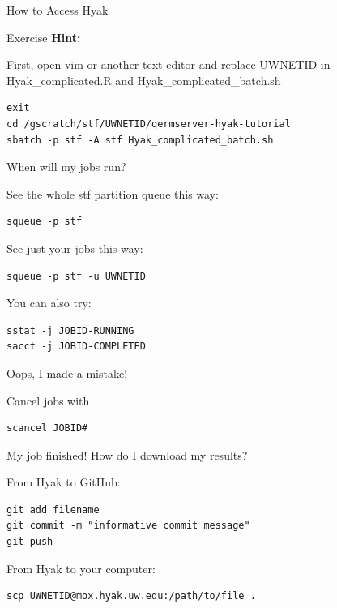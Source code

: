 \documentclass[ignorenonframetext,]{beamer}
\begin{document}
\begin{frame}[fragile]{How to Access Hyak}
\begin{block}{Exercise}
\textbf{Hint:}

First, open vim or another text editor and replace UWNETID in
Hyak\_complicated.R and Hyak\_complicated\_batch.sh

\begin{verbatim}
exit
cd /gscratch/stf/UWNETID/qermserver-hyak-tutorial
sbatch -p stf -A stf Hyak_complicated_batch.sh
\end{verbatim}

\end{block}

\begin{block}{When will my jobs run?}

See the whole stf partition queue this way:

\begin{verbatim}
squeue -p stf
\end{verbatim}

See just your jobs this way:

\begin{verbatim}
squeue -p stf -u UWNETID
\end{verbatim}

You can also try:

\begin{verbatim}
sstat -j JOBID-RUNNING
sacct -j JOBID-COMPLETED
\end{verbatim}

\end{block}

\begin{block}{Oops, I made a mistake!}

Cancel jobs with

\begin{verbatim}
scancel JOBID#
\end{verbatim}

\end{block}

\begin{block}{My job finished! How do I download my results?}

From Hyak to GitHub:

\begin{verbatim}
git add filename
git commit -m "informative commit message"
git push
\end{verbatim}

From Hyak to your computer:

\begin{verbatim}
scp UWNETID@mox.hyak.uw.edu:/path/to/file .
\end{verbatim}


\end{block}
\end{frame}
\end{document}
